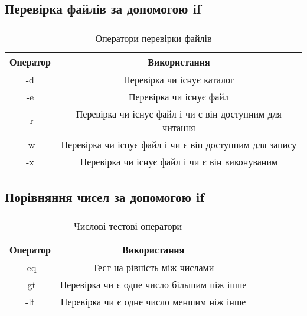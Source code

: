 \documentclass[t]{beamer}  %
\begin{document}
\subsection{Перевірка файлів за допомогою  if}
\begin{frame}
  \frametitle{\insertsection} 
	\framesubtitle{\insertsubsection}
  
  \begin{table}
    \caption{Оператори перевірки файлів}
    \label{tab:}
  
    \begin{center}
      \begin{tabular}{|c|c|}
        \hline
         {\bf Оператор} & {\bf Використання} \\
         \hline
         -d & Перевірка чи існує каталог \\
         \hline
         -e & Перевірка чи існує файл \\
         \hline
         -r & Перевірка чи існує файл і чи є він доступним для читання \\
         \hline
         -w & Перевірка чи існує файл і чи є він доступним для запису \\
         \hline
         -x & Перевірка чи існує файл і чи є він виконуваним \\
         \hline
      \end{tabular}
    \end{center}
  \end{table}
  
\end{frame}

\subsection{Порівняння чисел за допомогою  if}
\begin{frame}
  \frametitle{\insertsection} 
	\framesubtitle{\insertsubsection}
  
  \begin{table}
    \caption{Числові тестові оператори}
    \label{tab:}
  
    \begin{center}
      \begin{tabular}{|c|c|}
        \hline
         {\bf Оператор} & {\bf Використання} \\
         \hline
         -eq & Тест на рівність між числами \\
         \hline
         -gt & Перевірка чи є одне число більшим ніж інше \\
         \hline
         -lt & Перевірка чи є одне число меншим ніж інше \\
         \hline
      \end{tabular}
    \end{center}
  \end{table}
  
\end{frame}
\end{document}
